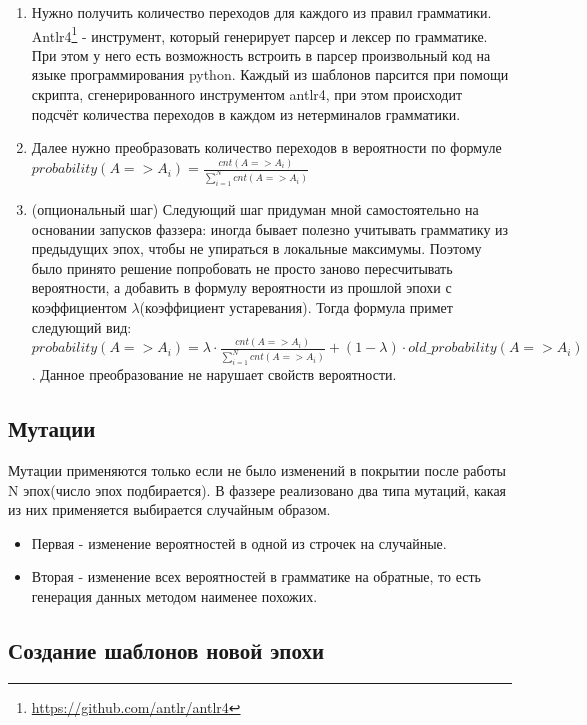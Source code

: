 \documentclass[a4paper]{article}
\begin{document}
\begin{enumerate}
    \item Нужно получить количество переходов для каждого из правил грамматики. Antlr4\footnote{\href{https://github.com/antlr/antlr4}{https://github.com/antlr/antlr4}} - инструмент, который генерирует парсер и лексер по грамматике. При этом у него есть возможность встроить в парсер произвольный код на языке программирования python. Каждый из шаблонов парсится при помощи скрипта, сгенерированного инструментом antlr4, при этом происходит подсчёт количества переходов в каждом из нетерминалов грамматики.
    \item Далее нужно преобразовать количество переходов в вероятности по формуле $probability (A => A_i) = \frac{cnt(A => A_i)}{\sum_{i=1}^{N}cnt(A => A_i)}$
    \item (опциональный шаг) Следующий шаг придуман мной самостоятельно на основании запусков фаззера: иногда бывает полезно учитывать грамматику из предыдущих эпох, чтобы не упираться в локальные максимумы. Поэтому было принято решение попробовать не просто заново пересчитывать вероятности, а добавить в формулу вероятности из прошлой эпохи с коэффициентом $\lambda$(коэффициент устаревания). Тогда формула примет следующий вид: $probability (A => A_i) = \lambda \cdot \frac{cnt(A => A_i)}{\sum_{i=1}^{N}cnt(A => A_i)} + (1 - \lambda) \cdot old\_probability (A => A_i)$. Данное преобразование не нарушает свойств вероятности.
\end{enumerate}

\subsection{Мутации}

Мутации применяются только если не было изменений в покрытии после работы N эпох(число эпох подбирается). В фаззере реализовано два типа мутаций, какая из них применяется выбирается случайным образом.
\begin{itemize}
    \item Первая - изменение вероятностей в одной из строчек на случайные.
    \item Вторая - изменение всех вероятностей в грамматике на обратные, то есть генерация данных методом наименее похожих.
\end{itemize}

\subsection{Создание шаблонов новой эпохи}
\end{document}

